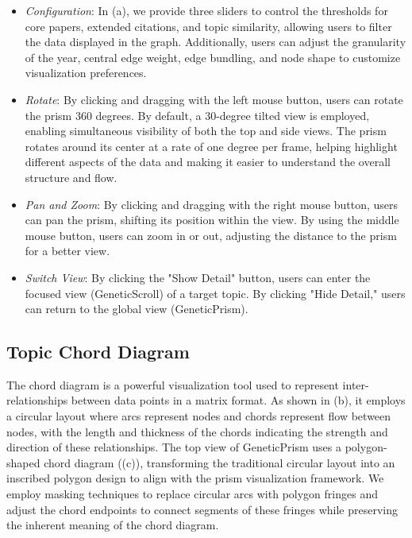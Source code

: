 \begin{itemize}
    \item \emph{Configuration}: In (a), we provide three sliders to control the thresholds for core papers, extended citations, and topic similarity, allowing users to filter the data displayed in the graph. Additionally, users can adjust the granularity of the year, central edge weight, edge bundling, and node shape to customize visualization preferences.

    \item \emph{Rotate}: By clicking and dragging with the left mouse button, users can rotate the prism 360 degrees. By default, a 30-degree tilted view is employed, enabling simultaneous visibility of both the top and side views. The prism rotates around its center at a rate of one degree per frame, helping highlight different aspects of the data and making it easier to understand the overall structure and flow.

    \item \emph{Pan and Zoom}: By clicking and dragging with the right mouse button, users can pan the prism, shifting its position within the view. By using the middle mouse button, users can zoom in or out, adjusting the distance to the prism for a better view.

    \item \emph{Switch View}: By clicking the "Show Detail" button, users can enter the focused view (GeneticScroll) of a target topic. By clicking "Hide Detail," users can return to the global view (GeneticPrism).

\end{itemize}


\subsection{Topic Chord Diagram}


The chord diagram is a powerful visualization tool used to represent inter-relationships between data points in a matrix format. As shown in (b), it employs a circular layout where arcs represent nodes and chords represent flow between nodes, with the length and thickness of the chords indicating the strength and direction of these relationships. The top view of GeneticPrism uses a polygon-shaped chord diagram ((c)), transforming the traditional circular layout into an inscribed polygon design to align with the prism visualization framework. We employ masking techniques to replace circular arcs with polygon fringes and adjust the chord endpoints to connect segments of these fringes while preserving the inherent meaning of the chord diagram.

